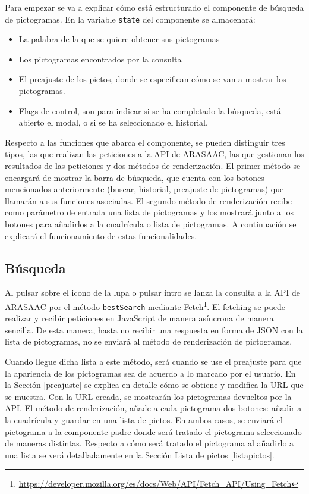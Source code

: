 Para empezar se va a explicar cómo está estructurado el componente de búsqueda de pictogramas. En la variable \texttt{state} del componente se almacenará:

\begin{itemize}
	\item La palabra de la que se quiere obtener sus pictogramas
	\item Los pictogramas encontrados por la consulta
	\item El preajuste de los pictos, donde se especifican cómo se van a mostrar los pictogramas.
	\item Flags de control, son para indicar si se ha completado la búsqueda, está abierto el modal, o si se ha seleccionado el historial.     
\end{itemize}

Respecto a las funciones que abarca el componente, se pueden distinguir tres tipos, las que realizan las peticiones a la API de ARASAAC, las que gestionan los resultados de las peticiones y dos métodos de renderización. El primer método se encargará de mostrar la barra de búsqueda, que cuenta con los botones mencionados anteriormente (buscar, historial, preajuste de pictogramas) que llamarán a sus funciones asociadas. El segundo método de renderización recibe como parámetro de entrada una lista de pictogramas y los mostrará junto a los botones para añadirlos a la cuadrícula o lista de pictogramas. A continuación se explicará el funcionamiento de estas funcionalidades. 


\subsection{Búsqueda}

Al pulsar sobre el icono de la lupa o pulsar intro se lanza la consulta a la API de ARASAAC por el método \texttt{bestSearch} mediante Fetch\footnote{\url{https://developer.mozilla.org/es/docs/Web/API/Fetch_API/Using_Fetch}}. El fetching se puede realizar y recibir peticiones en JavaScript de manera asíncrona de manera sencilla. De esta manera, hasta no recibir una respuesta en forma de JSON con la lista de pictogramas, no se enviará al método de renderización de pictogramas. 

Cuando llegue dicha lista a este método, será cuando se use el preajuste para que la apariencia de los pictogramas sea de acuerdo a lo marcado por el usuario. En la Sección \ref{preajuste} se explica en detalle cómo se obtiene y modifica la URL que se muestra. Con la URL creada, se mostrarán los pictogramas devueltos por la API. El método de renderización, añade a cada pictograma dos botones: añadir a la cuadrícula y guardar en una lista de pictos. En ambos casos, se enviará el pictograma a la componente padre donde será tratado el pictograma seleccionado de maneras distintas. Respecto a cómo será tratado el pictograma al añadirlo a una lista se verá detalladamente en la Sección Lista de pictos \ref{listapictos}.

